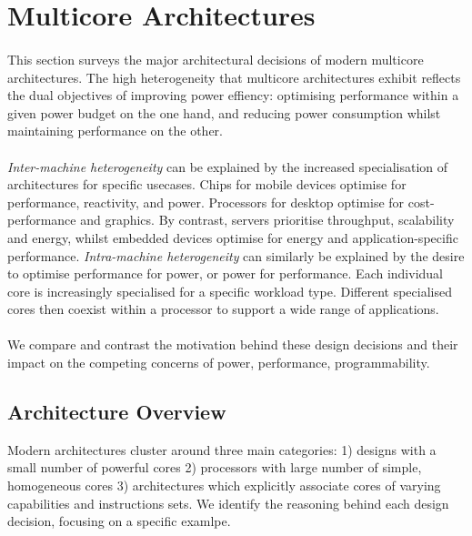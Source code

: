
\section{Multicore Architectures}
\paragraph{}  This section surveys the major architectural decisions of modern multicore 
architectures. The high heterogeneity that multicore architectures exhibit
reflects the dual objectives of improving power effiency:
optimising performance within a given power budget on the one hand, 
and reducing power consumption whilst maintaining performance on the other.



\paragraph{} \emph{Inter-machine heterogeneity} can be explained by the
increased specialisation of  architectures for specific usecases. Chips for
mobile devices optimise for performance, reactivity, and power.
Processors for desktop optimise for cost-performance and graphics.
By contrast, servers prioritise throughput, scalability and energy,
whilst embedded devices optimise for energy and application-specific
performance. \emph {Intra-machine heterogeneity} can 
similarly be explained by the desire to optimise performance for power, or power
for performance. Each individual core is increasingly specialised
for a specific workload type. Different specialised cores then coexist within
a processor to support a wide range of applications. 

\paragraph{} We compare and contrast the motivation behind these
design decisions and their impact on the competing
concerns of power, performance, programmability.


\subsection{Architecture Overview}


Modern architectures cluster around three main categories:
1) designs with a small number of powerful cores 2) processors with large number of
simple, homogeneous cores 3) architectures which explicitly associate
cores of varying capabilities and instructions sets. We identify the
reasoning behind each design decision, focusing on a specific examlpe. 


